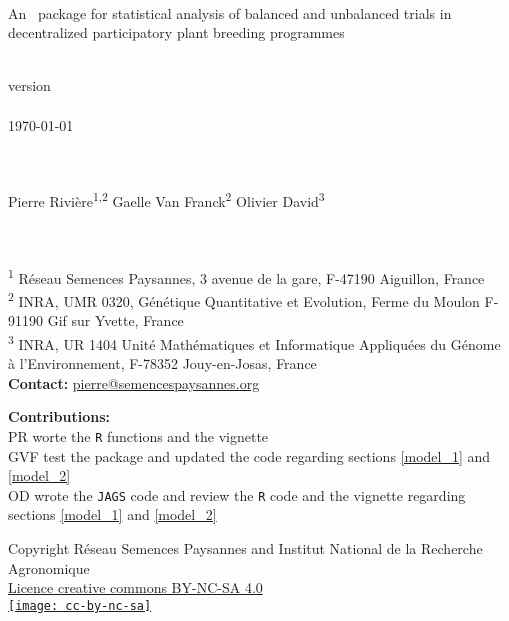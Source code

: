 \pagestyle{empty}
\begin{center}
\Huge{\pack } \\
\Large{An \R~package for statistical analysis of balanced and unbalanced trials in decentralized participatory plant breeding programmes}

~\\

version \versionnumber \\

~\\
\today

~\\~\\

Pierre Rivi\`ere\textsuperscript{1,2} \hspace{1cm} 
Gaelle Van Franck\textsuperscript{2} \hspace{1cm}
Olivier David\textsuperscript{3} \\
~\\~\\ 
\end{center}

\vfill

\noindent\textsuperscript{1} R\'eseau Semences Paysannes, 3 avenue de la gare, F-47190 Aiguillon, France \\
\textsuperscript{2} INRA, UMR 0320, Génétique Quantitative et Evolution, Ferme du Moulon F-91190 Gif sur Yvette, France \\
\textsuperscript{3} INRA, UR 1404 Unité Mathématiques et Informatique Appliquées du Génome à l'Environnement, F-78352 Jouy-en-Josas, France \\ 
\textbf{Contact:} \href{mailto:pierre@semencespaysannes.org}{pierre@semencespaysannes.org} \\

\vfill

\noindent\textbf{Contributions:} \\
PR worte the \texttt{R} functions and the vignette \\
GVF test the package and updated the code regarding sections \ref{model_1} and \ref{model_2} \\
OD wrote the \texttt{JAGS} code and review the \texttt{R} code and the vignette regarding sections \ref{model_1} and \ref{model_2} \\

\vfill

\begin{center}
Copyright Réseau Semences Paysannes and Institut National de la Recherche Agronomique \\
\href{http://creativecommons.org/licenses/by-nc-sa/4.0/}{Licence creative commons BY-NC-SA 4.0} \\
\vspace{.25cm}
\href{http://creativecommons.org/licenses/by-nc-sa/4.0/}{\texttt{[image: cc-by-nc-sa]}}
\end{center}

